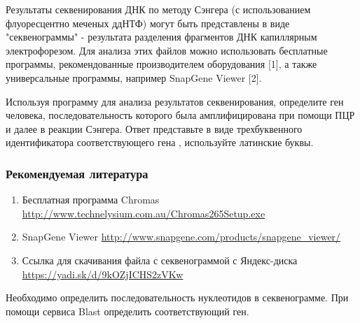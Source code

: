 
Результаты секвенирования ДНК по методу Сэнгера (с использованием флуоресцентно меченых ддНТФ) могут быть представлены в виде "секвенограммы" - результата разделения фрагментов ДНК капиллярным электрофорезом. Для анализа этих файлов можно использовать бесплатные программы, рекомендованные производителем оборудования [1], а также универсальные программы, например SnapGene Viewer [2].

Используя программу для анализа результатов секвенирования, определите ген человека, последовательность которого была амплифицирована при помощи ПЦР и далее в  реакции Сэнгера. Ответ представьте в виде трехбуквенного идентификатора соответствующего гена , используйте латинские буквы.

\subsubsection*{Рекомендуемая литература}

\begin{enumerate}
    \item Бесплатная программа Chromas\\ \url{http://www.technelysium.com.au/Chromas265Setup.exe}
    \item SnapGene Viewer \url{http://www.snapgene.com/products/snapgene_viewer/}
    \item Ссылка для скачивания файла с секвенограммой с Яндекс-диска  \url{https://yadi.sk/d/9kOZjICHS2zVKw} 
\end{enumerate}

\explanationSection

Необходимо определить последовательность нуклеотидов в секвенограмме. При помощи сервиса Blast определить соответствующий ген.

